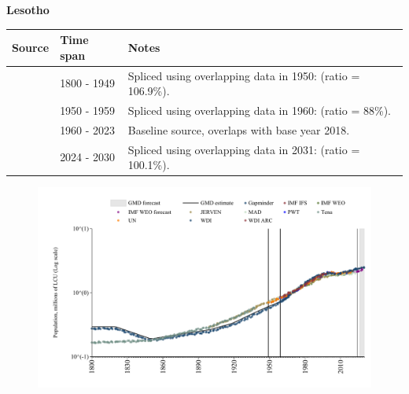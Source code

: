\documentclass[12pt,a4paper,landscape]{article}
\begin{document}
\begin{adjustbox}{max totalsize={\paperwidth}{\paperheight},center}
\begin{minipage}[t][\textheight][t]{\textwidth}
\vspace*{0.5cm}
{}
\begin{center}
{\Large\bfseries Lesotho}
\end{center}
\vspace{0.5cm}
\begin{table}[H]
\centering
\small
\begin{tabular}{|l|l|l|}
\hline
\textbf{Source} & \textbf{Time span} & \textbf{Notes} \\
\hline
\rowcolor{white}\cite{Gapminder}& 1800 - 1949 &Spliced using overlapping data in 1950: (ratio = 106.9\%).\\
\rowcolor{lightgray}\cite{IMF_IFS}& 1950 - 1959 &Spliced using overlapping data in 1960: (ratio = 88\%).\\
\rowcolor{white}\cite{WDI}& 1960 - 2023 &Baseline source, overlaps with base year 2018.\\
\rowcolor{lightgray}\cite{Gapminder}& 2024 - 2030 &Spliced using overlapping data in 2031: (ratio = 100.1\%).\\
\hline
\end{tabular}
\end{table}
\begin{figure}[H]
\centering
\includegraphics[width=\textwidth,height=0.6\textheight,keepaspectratio]{graphs/LSO_pop.pdf}
\end{figure}
\end{minipage}
\end{adjustbox}
\end{document}
